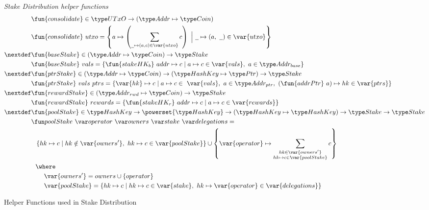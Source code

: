\begin{figure}[htb]
  \emph{Stake Distribution helper functions}
  \begin{align*}
      & \fun{consolidate} \in \UTxO \to (\Addr \mapsto \Coin) \\
      & \fun{consolidate}~{utxo} =
        \left\{a \mapsto \left(\sum_{\wcard\mapsto(a,c)\in\var{utxo}}c\right)
        ~\Big\vert~
        \wcard\mapsto(a,~\wcard)\in\var{utxo} \right\} \\ 
      \nextdef
      & \fun{baseStake} \in (\Addr\mapsto\Coin) \to \Stake \\
      & \fun{baseStake}~{vals} =
          \{\fun{stakeHK_b}~{addr}\mapsto c \mid a\mapsto c\in\var{vals},~a\in\AddrB\} \\
      \nextdef
      & \fun{ptrStake} \in (\Addr\mapsto\Coin) \to (\HashKey\mapsto\Ptr) \to \Stake \\
      & \fun{ptrStake}~{vals}~{ptrs} =
          \{\var{hk}\mapsto c
          \mid a\mapsto
          c\in~\var{vals},~a\in\AddrP,~(\fun{addrPtr}~a) \mapsto hk\in\var{ptrs}\} \\
      \nextdef
      & \fun{rewardStake} \in (\AddrRWD\mapsto\Coin) \to \Stake \\
      & \fun{rewardStake}~{rewards} =
          \{\fun{stakeHK_r}~{addr}\mapsto c \mid a\mapsto c\in\var{rewards}\} \\
      \nextdef
      & \fun{poolStake} \in \HashKey \to \powerset{\HashKey} \to (\HashKey \mapsto \HashKey)
          \to \Stake \to \Stake \\
      & \poolStake{operator}{owners}{stake}{delegations} = \\
      & ~~ \left\{hk\mapsto c \mid hk\notin\var{owners'},~hk\mapsto c\in\var{poolStake} \right\}
           \cup
           \left\{ \var{operator}\mapsto
             \sum_{\substack{hk\in\var{owners'} \\ hk\mapsto c\in\var{poolStake}}} c\right\} \\
      & ~~ \where \\
      & ~~~~~~ \var{owners'} = owners \cup \{operator\} \\
      & ~~~~~~ \var{poolStake} =
                 \{hk \mapsto c
                 \mid
                 hk \mapsto c\in\var{stake},~hk\mapsto\var{operator}\in\var{delegations} \} \\
  \end{align*}
  \caption{Helper Functions used in Stake Distribution}
  \label{fig:functions:helper-stake-distribution}
\end{figure}

